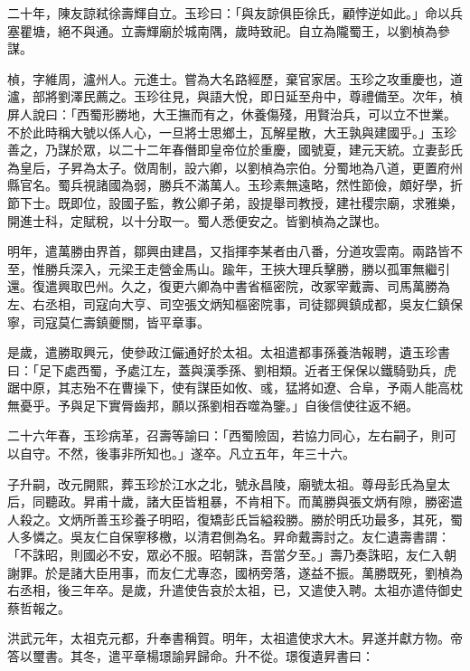 二十年，陳友諒弒徐壽輝自立。玉珍曰：「與友諒俱臣徐氏，顧悖逆如此。」命以兵塞瞿塘，絕不與通。立壽輝廟於城南隅，歲時致祀。自立為隴蜀王，以劉楨為參謀。

楨，字維周，瀘州人。元進士。嘗為大名路經歷，棄官家居。玉珍之攻重慶也，道瀘，部將劉澤民薦之。玉珍往見，與語大悅，即日延至舟中，尊禮備至。次年，楨屏人說曰：「西蜀形勝地，大王撫而有之，休養傷殘，用賢治兵，可以立不世業。不於此時稱大號以係人心，一旦將士思鄉土，瓦解星散，大王孰與建國乎。」玉珍善之，乃謀於眾，以二十二年春僭即皇帝位於重慶，國號夏，建元天統。立妻彭氏為皇后，子昇為太子。傚周制，設六卿，以劉楨為宗伯。分蜀地為八道，更置府州縣官名。蜀兵視諸國為弱，勝兵不滿萬人。玉珍素無遠略，然性節儉，頗好學，折節下士。既即位，設國子監，教公卿子弟，設提舉司教授，建社稷宗廟，求雅樂，開進士科，定賦稅，以十分取一。蜀人悉便安之。皆劉楨為之謀也。

明年，遣萬勝由界首，鄒興由建昌，又指揮李某者由八番，分道攻雲南。兩路皆不至，惟勝兵深入，元梁王走營金馬山。踰年，王挾大理兵擊勝，勝以孤軍無繼引還。復遣興取巴州。久之，復更六卿為中書省樞密院，改冢宰戴壽、司馬萬勝為左、右丞相，司寇向大亨、司空張文炳知樞密院事，司徒鄒興鎮成都，吳友仁鎮保寧，司寇莫仁壽鎮夔關，皆平章事。

是歲，遣勝取興元，使參政江儼通好於太祖。太祖遣都事孫養浩報聘，遺玉珍書曰：「足下處西蜀，予處江左，蓋與漢季孫、劉相類。近者王保保以鐵騎勁兵，虎踞中原，其志殆不在曹操下，使有謀臣如攸、彧，猛將如遼、合阜，予兩人能高枕無憂乎。予與足下實脣齒邦，願以孫劉相吞噬為鑒。」自後信使往返不絕。

二十六年春，玉珍病革，召壽等諭曰：「西蜀險固，若協力同心，左右嗣子，則可以自守。不然，後事非所知也。」遂卒。凡立五年，年三十六。

子升嗣，改元開熙，葬玉珍於江水之北，號永昌陵，廟號太祖。尊母彭氏為皇太后，同聽政。昇甫十歲，諸大臣皆粗暴，不肯相下。而萬勝與張文炳有隙，勝密遣人殺之。文炳所善玉珍養子明昭，復矯彭氏旨縊殺勝。勝於明氏功最多，其死，蜀人多憐之。吳友仁自保寧移檄，以清君側為名。昇命戴壽討之。友仁遺壽書謂：「不誅昭，則國必不安，眾必不服。昭朝誅，吾當夕至。」壽乃奏誅昭，友仁入朝謝罪。於是諸大臣用事，而友仁尤專恣，國柄旁落，遂益不振。萬勝既死，劉楨為右丞相，後三年卒。是歲，升遣使告哀於太祖，已，又遣使入聘。太祖亦遣侍御史蔡哲報之。

洪武元年，太祖克元都，升奉書稱賀。明年，太祖遣使求大木。昇遂并獻方物。帝答以璽書。其冬，遣平章楊璟諭昇歸命。升不從。璟復遺昇書曰：

